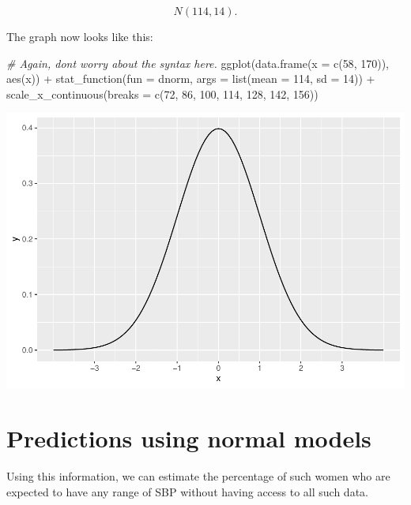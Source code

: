 \documentclass[
]{book}
\newenvironment{Shaded}{\begin{snugshade}}{\end{snugshade}}
\newcommand{\AttributeTok}[1]{\textcolor[rgb]{0.77,0.63,0.00}{#1}}
\newcommand{\CommentTok}[1]{\textcolor[rgb]{0.56,0.35,0.01}{\textit{#1}}}
\newcommand{\DecValTok}[1]{\textcolor[rgb]{0.00,0.00,0.81}{#1}}
\newcommand{\FunctionTok}[1]{\textcolor[rgb]{0.00,0.00,0.00}{#1}}
\newcommand{\NormalTok}[1]{#1}
\newcommand{\SpecialCharTok}[1]{\textcolor[rgb]{0.00,0.00,0.00}{#1}}
\begin{document}
\[
N(114, 14).
\]

The graph now looks like this:

\begin{Shaded}
\begin{Highlighting}[]
\CommentTok{\# Again, don\textquotesingle{}t worry about the syntax here.}
\FunctionTok{ggplot}\NormalTok{(}\FunctionTok{data.frame}\NormalTok{(}\AttributeTok{x =} \FunctionTok{c}\NormalTok{(}\DecValTok{58}\NormalTok{, }\DecValTok{170}\NormalTok{)), }\FunctionTok{aes}\NormalTok{(x)) }\SpecialCharTok{+}
    \FunctionTok{stat\_function}\NormalTok{(}\AttributeTok{fun =}\NormalTok{ dnorm, }\AttributeTok{args =} \FunctionTok{list}\NormalTok{(}\AttributeTok{mean =} \DecValTok{114}\NormalTok{, }\AttributeTok{sd =} \DecValTok{14}\NormalTok{)) }\SpecialCharTok{+}
    \FunctionTok{scale\_x\_continuous}\NormalTok{(}\AttributeTok{breaks =} \FunctionTok{c}\NormalTok{(}\DecValTok{72}\NormalTok{, }\DecValTok{86}\NormalTok{, }\DecValTok{100}\NormalTok{, }\DecValTok{114}\NormalTok{, }\DecValTok{128}\NormalTok{, }\DecValTok{142}\NormalTok{, }\DecValTok{156}\NormalTok{))}
\end{Highlighting}
\end{Shaded}

\includegraphics{intro_stats_files/figure-latex/unnamed-chunk-336-1.pdf}

\hypertarget{normal-predictions}{%
\section{Predictions using normal models}\label{normal-predictions}}

Using this information, we can estimate the percentage of such women who are expected to have any range of SBP without having access to all such data.
\end{document}

